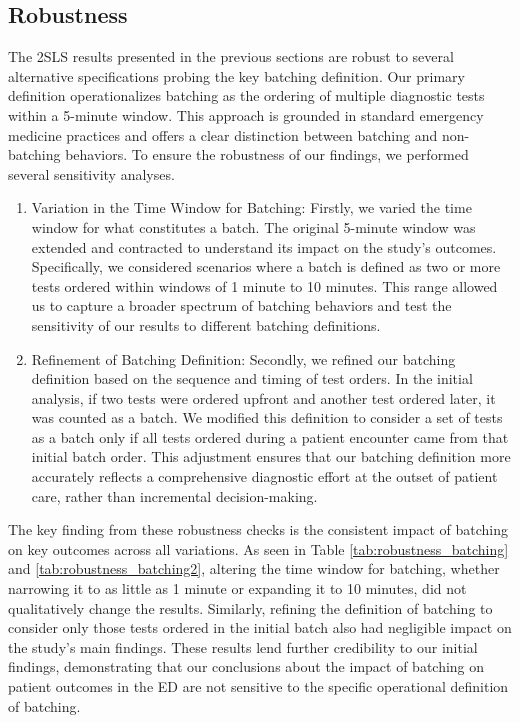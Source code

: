 \documentclass[,,nonblindrev]{informs}
\begin{document}
\hypertarget{robustness}{%
\subsection{Robustness}\label{robustness}}

The 2SLS results presented in the previous sections are robust to
several alternative specifications probing the key batching definition.
Our primary definition operationalizes batching as the ordering of
multiple diagnostic tests within a 5-minute window. This approach is
grounded in standard emergency medicine practices and offers a clear
distinction between batching and non-batching behaviors. To ensure the
robustness of our findings, we performed several sensitivity analyses.

\begin{enumerate}
\def\labelenumi{(\arabic{enumi})}
\item
  Variation in the Time Window for Batching: Firstly, we varied the time
  window for what constitutes a batch. The original 5-minute window was
  extended and contracted to understand its impact on the study's
  outcomes. Specifically, we considered scenarios where a batch is
  defined as two or more tests ordered within windows of 1 minute to 10
  minutes. This range allowed us to capture a broader spectrum of
  batching behaviors and test the sensitivity of our results to
  different batching definitions.
\item
  Refinement of Batching Definition: Secondly, we refined our batching
  definition based on the sequence and timing of test orders. In the
  initial analysis, if two tests were ordered upfront and another test
  ordered later, it was counted as a batch. We modified this definition
  to consider a set of tests as a batch only if all tests ordered during
  a patient encounter came from that initial batch order. This
  adjustment ensures that our batching definition more accurately
  reflects a comprehensive diagnostic effort at the outset of patient
  care, rather than incremental decision-making.
\end{enumerate}

The key finding from these robustness checks is the consistent impact of
batching on key outcomes across all variations. As seen in Table
\ref{tab:robustness_batching} and \ref{tab:robustness_batching2},
altering the time window for batching, whether narrowing it to as little
as 1 minute or expanding it to 10 minutes, did not qualitatively change
the results. Similarly, refining the definition of batching to consider
only those tests ordered in the initial batch also had negligible impact
on the study's main findings. These results lend further credibility to
our initial findings, demonstrating that our conclusions about the
impact of batching on patient outcomes in the ED are not sensitive to
the specific operational definition of batching.
\end{document}
